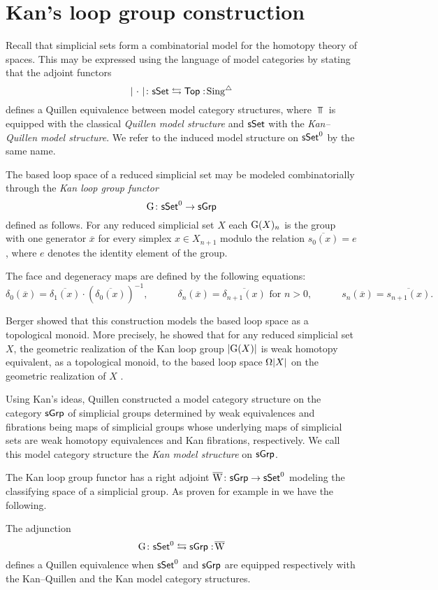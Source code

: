 \section{Kan's loop group construction}

Recall that simplicial sets form a combinatorial model for the homotopy theory of spaces.
This may be expressed using the language of model categories by stating that the adjoint functors
\[
\lvert\ \cdot\ \rvert \colon \mathsf{sSet} \leftrightarrows \mathsf{Top} :\! \operatorname{Sing^{\triangle}}
\]
defines a Quillen equivalence between model category structures, where $\Top$ is equipped with the classical \textit{Quillen model structure} and $\mathsf{sSet}$ with the \textit{Kan--Quillen model structure}.
We refer to the induced model structure on $\mathsf{sSet}^0$ by the same name.

The based loop space of a reduced simplicial set may be modeled combinatorially through the \textit{Kan loop group functor}
\[
\operatorname{G} \colon \mathsf{sSet}^0 \to \mathsf{sGrp}
\]
defined as follows.
For any reduced simplicial set $X$ each $\operatorname{G}(X)_n$ is the group with one generator $\overline{x}$ for every simplex $x \in X_{n+1}$ modulo the relation $\overline{s_0(x)} = e$, where $e$ denotes the identity element of the group.

The face and degeneracy maps are defined by the following equations:
\[
\delta_0(\overline{x}) = \overline{\delta_1(x)} \cdot (\overline{\delta_0(x)})^{-1}, \qquad \quad
\delta_n(\overline{x}) = \overline{\delta_{n+1}(x)} \text{ for } n>0, \qquad \quad
s_n(\overline{x}) = \overline{s_{n+1}(x)}.
\]

Berger showed that this construction models the based loop space as a topological monoid.
More precisely, he showed that for any reduced simplicial set $X$, the geometric realization of the Kan loop group $\lvert\operatorname{G}(X)\rvert$ is weak homotopy equivalent, as a topological monoid, to the based loop space $\Omega \lvert X\rvert$ on the geometric realization of $X$ \cite{berger1995loops}.

Using Kan's ideas, Quillen constructed a model category structure on the category $\mathsf{sGrp}$ of simplicial groups determined by
weak equivalences and fibrations being maps of simplicial groups whose underlying maps of simplicial sets are weak homotopy equivalences and Kan fibrations, respectively.
We call this model category structure the \textit{Kan model structure} on $\mathsf{sGrp}$.

The Kan loop group functor has a right adjoint $\operatorname{\overline{W}} \colon \mathsf{sGrp} \to \mathsf{sSet}^0$ modeling the classifying space of a simplicial group.
As proven for example in \cite[Chapter V]{goerss2009simplicial} we have the following.

\begin{proposition} \label{p:kan adjuntion}
	The adjunction
	\[
	\operatorname{G} \colon \mathsf{sSet}^0 \leftrightarrows \mathsf{sGrp} :\! \operatorname{\overline{W}}
	\]
	defines a Quillen equivalence when $\mathsf{sSet}^0$ and $\mathsf{sGrp}$ are equipped respectively with the Kan--Quillen and the Kan model category structures.
\end{proposition}
